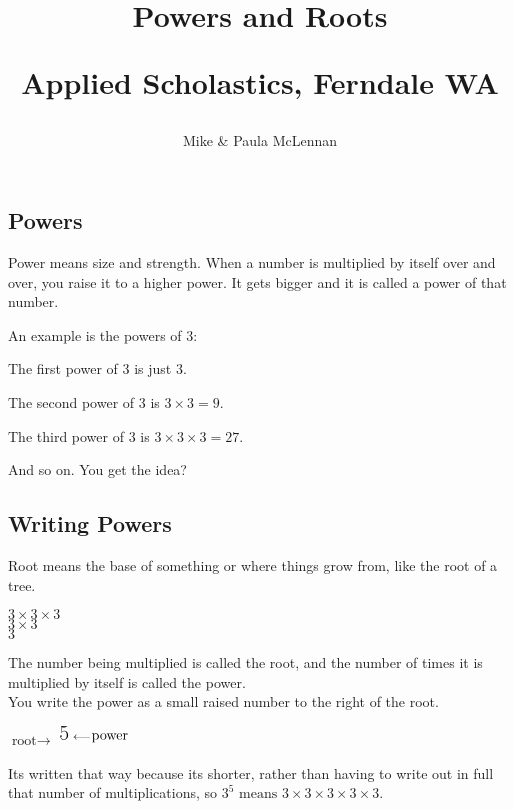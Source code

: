 \documentclass{article}
\author{Mike \& Paula McLennan}
\date{}
\title{Powers and Roots\\
\vspace{28pt}
\begin{normalsize}Applied Scholastics, Ferndale WA \end{normalsize}}
\begin{document}
\maketitle
\pagebreak
\tableofcontents
\pagebreak

\begin{spacing}{1.25}

\section{Powers}
Power means size and strength. When a number is multiplied by itself over and over, you raise it to a higher power. It gets bigger and it is called a power of that number.

\vspace{28pt}
An example is the powers of 3:

The first power of 3 is just 3.

The second power of 3 is $3 \times 3 = 9.$

The third power of 3 is $3 \times 3 \times 3 = 27.$

\vspace{28pt}
And so on. You get the idea?

\pagebreak

\subsection*{Writing Powers}

Root means the base of something or where things grow from, like the root of a tree.

\begin{center}
$3 \times 3 \times 3$\\
$3 \times 3$\\
$3$
\end{center}

The number being multiplied is called the root, and the number of times it is multiplied by itself is called the power.\\

You write the power as a small raised number to the right of the root.

\begin{center}
$\text{root}\rightarrow$
{\fontsize{30}{34}}
$\textsuperscript{{\fontsize{15}{20}\selectfont 5} $\longleftarrow$}\textsuperscript{\normalsize{\text{power}}}$
\normalsize
\end{center}

Its written that way because its shorter, rather than having to write out in full that number of multiplications, so $3^5 \text{ means }3 \times 3 \times 3 \times 3 \times 3.$\\


\end{spacing}
\end{document}
